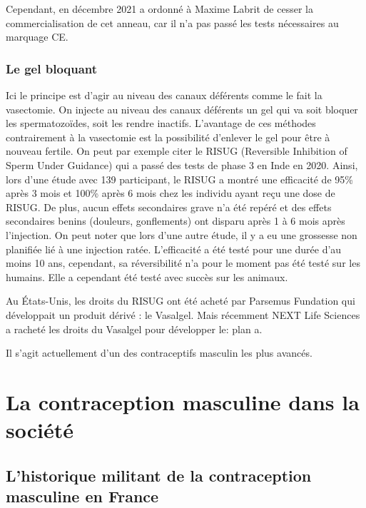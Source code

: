 \documentclass[12pt,a4paper]{report}
\begin{document}
Cependant, en décembre 2021 a ordonné à Maxime Labrit de cesser la commercialisation de cet anneau, car il n'a pas passé les tests nécessaires au marquage CE. \cite{ActualiteAnneauContraceptif}

\subsection{Le gel bloquant}

Ici le principe est d'agir au niveau des canaux déférents comme le fait la vasectomie. On injecte au niveau des canaux déférents un gel qui va soit bloquer les spermatozoïdes, soit les rendre inactifs.
L'avantage de ces méthodes contrairement à la vasectomie est la possibilité d'enlever le gel pour être à nouveau fertile.
On peut par exemple citer le RISUG (Reversible Inhibition of Sperm Under Guidance) qui a passé des tests de phase 3 en Inde en 2020. \cite{ContraceptionMasculineScience}
Ainsi, lors d'une étude avec 139 participant, le RISUG a montré une efficacité de 95\% après 3 mois et 100\% après 6 mois chez les individu ayant reçu une dose de RISUG. De plus, aucun effets secondaires grave n'a été repéré et des effets secondaires benins (douleurs, gonflements) ont disparu après 1 à 6 mois après l'injection. \cite{sharmaSafetyEfficacyIntravasal2019}
On peut noter que lors d'une autre étude, il y a eu une grossesse non planifiée lié à une injection ratée. \cite{RisugWikipedia}
L'efficacité a été testé pour une durée d'au moins 10 ans, cependant, sa réversibilité n'a pour le moment pas été testé sur les humains. Elle a cependant été testé avec succès sur les animaux. \cite{khilwaniRISUGMaleContraceptive2020}

Au États-Unis, les droits du RISUG ont été acheté par Parsemus Fundation qui développait un produit dérivé : le Vasalgel. Mais récemment NEXT Life Sciences a racheté les droits du Vasalgel pour développer le: plan a. \cites{ReversibleInhibitionSperm}{VasalgelMaleContraceptive}{PlanReversibleMale}

Il s'agit actuellement d'un des contraceptifs masculin les plus avancés. \cite{ContraceptionMasculineScience}

\chapter{La contraception masculine dans la société}

\section{L'historique militant de la contraception masculine en France} \label{section:militant}
\end{document}
